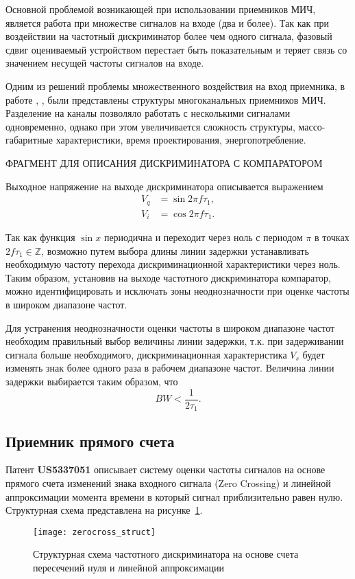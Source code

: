 Основной проблемой возникающей при использовании приемников МИЧ, является работа при множестве сигналов на входе (два и более). Так как при воздействии на частотный дискриминатор более чем одного сигнала, фазовый сдвиг оцениваемый устройством перестает быть показательным и теряет связь со значением несущей частоты сигналов на входе.

Одним из решений проблемы множественного воздействия на вход приемника, в работе \cite{Choi2014}, \cite{gruchalla_instantaneous_2006}, были представлены структуры многоканальных приемников МИЧ. Разделение на каналы позволяло работать с несколькими сигналами одновременно, однако при этом увеличивается сложность структуры, массо-габаритные характеристики, время проектирования, энергопотребление.

ФРАГМЕНТ ДЛЯ ОПИСАНИЯ ДИСКРИМИНАТОРА С КОМПАРАТОРОМ

Выходное напряжение на выходе дискриминатора описывается выражением
\begin{equation*}
	\begin{aligned}
		V_{q} &= \sin{2 \pi f \tau_{1}},\\
		V_{i} &= \cos{2 \pi f \tau_{1}}.
	\end{aligned}
\end{equation*}

Так как функция \(\sin{x}\) периодична и переходит через ноль с периодом \(\pi\) в точках \(2 f \tau_{1} \in \mathbb{Z} \), возможно путем выбора длины линии задержки устанавливать необходимую частоту перехода дискриминационной характеристики через ноль. Таким образом, установив на выходе частотного дискриминатора компаратор, можно идентифицировать и исключать зоны неоднозначности при оценке частоты в широком диапазоне частот.

Для устранения неоднозначности оценки частоты в широком диапазоне частот необходим правильный выбор величины линии задержки, т.к. при задерживании сигнала больше необходимого, дискриминационная характеристика \(V_s\) будет изменять знак более одного раза в рабочем диапазоне частот. Величина линии задержки выбирается таким образом, что
\begin{equation*}
	BW < \frac{1}{2 \tau_{1}}.
\end{equation*}



\subsection{Приемник прямого счета}
Патент \textbf{US5337051} описывает систему оценки частоты сигналов на основе прямого счета изменений знака входного сигнала (Zero Crossing) и линейной аппроксимации момента времени в который сигнал приблизительно равен нулю. Структурная схема представлена на рисунке~\ref{ct:zerocross_struct}.
\begin{figure}[ht]
	\centering
	\texttt{[image: zerocross\_struct]}
	
	\caption{Структурная схема частотного дискриминатора на основе счета пересечений нуля и линейной аппроксимации}
	\label{ct:zerocross_struct}
\end{figure}

